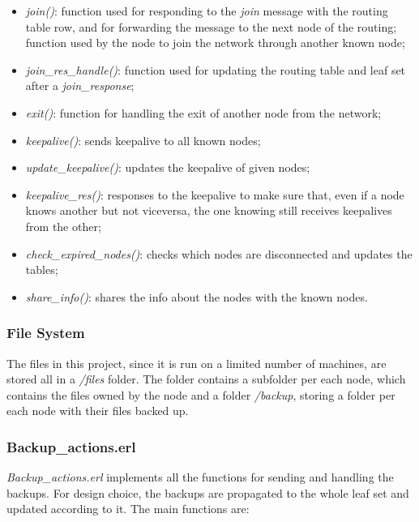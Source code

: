 \documentclass{article}
\begin{document}
\begin{itemize}
    \item \textit{join()}: function used for responding to the \textit{join} message with the routing table row, 
    and for forwarding the message to the next node of the routing; function used by the node to join the network through another known node;
    \item \textit{join\_res\_handle()}: function used for updating the routing table and leaf set after a \textit{join\_response};
    \item \textit{exit()}: function for handling the exit of another node from the network;
    \item \textit{keepalive()}: sends keepalive to all known nodes;
    \item \textit{update\_keepalive()}: updates the keepalive of given nodes;
    \item \textit{keepalive\_res()}: responses to the keepalive to make sure that, even if a node knows another but not viceversa, 
    the one knowing still receives keepalives from the other;
    \item \textit{check\_expired\_nodes()}: checks which nodes are disconnected and updates the tables;
    \item \textit{share\_info()}: shares the info about the nodes with the known nodes.
\end{itemize}

\subsubsection{File System}

The files in this project, since it is run on a limited number of machines, are stored all in a \textit{/files} folder.
The folder contains a subfolder per each node, which contains the files owned by the node and a folder \textit{/backup}, storing a folder
per each node with their files backed up.

\subsubsection{Backup\_actions.erl}

\textit{Backup\_actions.erl} implements all the functions for sending and handling the backups.
For design choice, the backups are propagated to the whole leaf set and updated according to it.
The main functions are:
\end{document}
